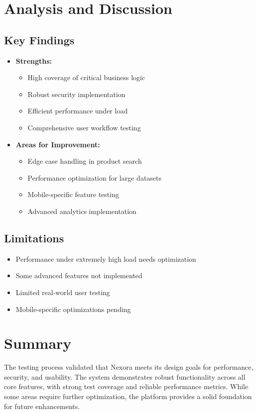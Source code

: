 \section{Analysis and Discussion}
\subsection{Key Findings}
\begin{itemize}
    \item \textbf{Strengths:}
    \begin{itemize}
        \item High coverage of critical business logic
        \item Robust security implementation
        \item Efficient performance under load
        \item Comprehensive user workflow testing
    \end{itemize}
    
    \item \textbf{Areas for Improvement:}
    \begin{itemize}
        \item Edge case handling in product search
        \item Performance optimization for large datasets
        \item Mobile-specific feature testing
        \item Advanced analytics implementation
    \end{itemize}
\end{itemize}

\subsection{Limitations}
\begin{itemize}
    \item Performance under extremely high load needs optimization
    \item Some advanced features not implemented
    \item Limited real-world user testing
    \item Mobile-specific optimizations pending
\end{itemize}

\section{Summary}
The testing process validated that Nexora meets its design goals for performance, security, and usability. The system demonstrates robust functionality across all core features, with strong test coverage and reliable performance metrics. While some areas require further optimization, the platform provides a solid foundation for future enhancements.

